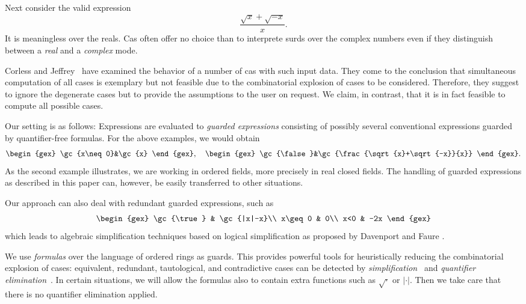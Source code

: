 Next consider the valid expression
$$
\frac{\sqrt{x}+\sqrt{-x}}{x}.
$$
It is meaningless over the reals. {\sc Cas} often offer no choice than
to interprete surds over the complex numbers even if they distinguish
between a {\em real} and a {\em complex} mode.

Corless and Jeffrey~\cite{CorlessJeffrey:92} have examined the
behavior of a number of {\sc cas} with such input data. They come to
the conclusion that simultaneous computation of all cases is exemplary
but not feasible due to the combinatorial explosion of cases to be
considered. Therefore, they suggest to ignore the degenerate cases but
to provide the assumptions to the user on request. We claim, in
contrast, that it is in fact feasible to compute all possible cases.

Our setting is as follows: Expressions are evaluated to {\em guarded
expressions} consisting of possibly several conventional expressions
guarded by quantifier-free formulas. For the above examples, we would
obtain
$$
\begin{gex}
\gc{x\neq0}&\gc{x}
\end{gex},\quad
\begin{gex}
\gc{\false}&\gc{\frac{\sqrt{x}+\sqrt{-x}}{x}}
\end{gex}.
$$
As the second example illustrates, we are working in ordered fields,
more precisely in real closed fields. The handling of guarded
expressions as described in this paper can, however, be easily
transferred to other situations.

Our approach can also deal with redundant guarded expressions, such as
$$
\begin{gex}
\gc{\true} & \gc{|x|-x}\\
x\geq0 & 0\\
x<0 & -2x
\end{gex}
$$
which leads to algebraic simplification techniques based on logical
simplification as proposed by Davenport and
Faure \cite{DavenportFaure:94}.

We use {\em formulas} over the language of ordered rings as guards.
This provides powerful tools for heuristically reducing the
combinatorial explosion of cases: equivalent, redundant, tautological,
and contradictive cases can be detected by {\em
simplification}~\cite{DolzmannSturm:95} and {\em quantifier
elimination}~\cite{Tarski:48,Collins:75,Weispfenning:88,LoosWeispfenning:93,Weispfenning:96,Weispfenning:94}.
In certain situations, we will allow the formulas also to contain
extra functions such as $\sqrt{\cdot}$ or $|\cdot|$. Then we take care
that there is no quantifier elimination applied.

